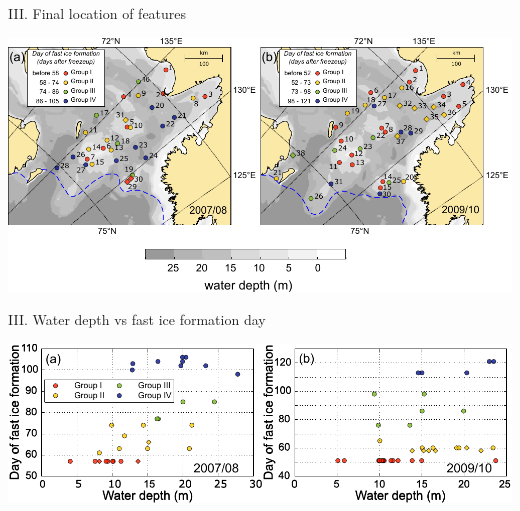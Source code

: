 \documentclass[8pt]{beamer}
\begin{document}
\setwatermark{\fontsize{125pt}{125pt}\selectfont{}}
\begin{frame}[fragile]{III. Final location of features}
\begin{center}
	\includegraphics[width=1.0\textwidth]{./img/groups_map.pdf}
\end{center}
\end{frame}

\setwatermark{\fontsize{125pt}{125pt}\selectfont{}}
\begin{frame}[fragile]{III. Water depth vs fast ice formation day}
	\begin{center}
		\includegraphics[width=1.0\textwidth]{./img/groups_depth.pdf}
	\end{center}
\end{frame}
\end{document}
